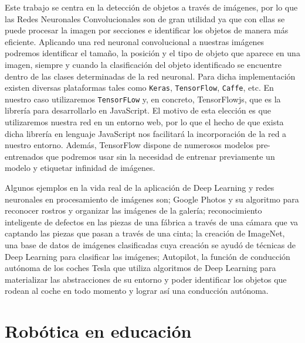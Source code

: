 \documentclass{report}
\begin{document}
Este trabajo se centra en la detección de objetos a través de imágenes, por lo que las Redes Neuronales Convolucionales son de gran utilidad ya que con ellas se puede procesar la imagen por secciones e identificar los objetos de manera más eficiente. Aplicando una red neuronal convolucional a nuestras imágenes podremos identificar el tamaño, la posición y el tipo de objeto que aparece en una imagen, siempre y cuando la clasificación del objeto identificado se encuentre dentro de las clases determinadas de la red neuronal. Para dicha implementación existen diversas plataformas tales como \texttt{Keras}, \texttt{TensorFlow}, \texttt{Caffe}, etc. En nuestro caso utilizaremos \texttt{TensorFLow} y, en concreto, TensorFlowjs, que es la librería para desarrollarlo en JavaScript. El motivo de esta elección es que utilizaremos nuestra red en un entorno web, por lo que el hecho de que exista dicha librería en lenguaje JavaScript nos facilitará la incorporación de la red a nuestro entorno. Además, TensorFlow dispone de numerosos modelos pre-entrenados que podremos usar sin la necesidad de entrenar previamente un modelo y etiquetar infinidad de imágenes.

Algunos ejemplos en la vida real de la aplicación de Deep Learning y redes neuronales en procesamiento de imágenes son; Google Photos y su algoritmo para reconocer rostros y organizar las imágenes de la galería; reconocimiento inteligente de defectos en las piezas de una fábrica a través de una cámara que va captando las piezas que pasan a través de una cinta; la creación de ImageNet, una base de datos de imágenes clasificadas cuya creación se ayudó de técnicas de Deep Learning para clasificar las imágenes; Autopilot, la función de conducción autónoma de los coches Tesla que utiliza algoritmos de Deep Learning para materializar las abstracciones de su entorno y poder identificar los objetos que rodean al coche en todo momento y lograr así una conducción autónoma. 

\section{Robótica en educación}
\end{document}
